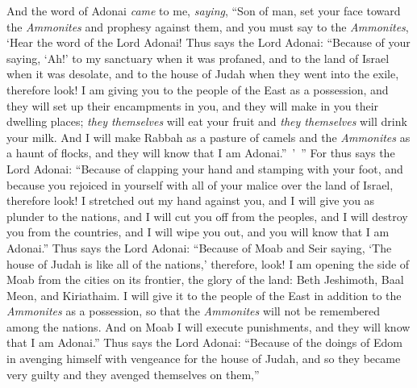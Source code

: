 \begin{biblechapter} %
 And the word of Adonai \textit{came} to me, \textit{saying},
\verse “Son of man, set your face toward the \textit{Ammonites} and prophesy against them,
\verse and you must say to the \textit{Ammonites}, ‘Hear the word of the Lord Adonai! Thus says the Lord Adonai: “Because of your saying, ‘Ah!’ to my sanctuary when it was profaned, and to the land of Israel when it was desolate, and to the house of Judah when they went into the exile,
\verse therefore look! I am giving you to the people of the East as a possession, and they will set up their encampments in you, and they will make in you their dwelling places; \textit{they themselves} will eat your fruit and \textit{they themselves} will drink your milk.
\verse And I will make Rabbah as a pasture of camels and the \textit{Ammonites} as a haunt of flocks, and they will know that I am Adonai.” ’ ”
\verse For thus says the Lord Adonai: “Because of clapping your hand and stamping with your foot, and because you rejoiced in yourself with all of your malice over the land of Israel,
\verse therefore look! I stretched out my hand against you, and I will give you as plunder to the nations, and I will cut you off from the peoples, and I will destroy you from the countries, and I will wipe you out, and you will know that I am Adonai.”
\verse Thus says the Lord Adonai: “Because of Moab and Seir saying, ‘The house of Judah is like all of the nations,’
\verse therefore, look! I am opening the side of Moab from the cities on its frontier, the glory of the land: Beth Jeshimoth, Baal Meon, and Kiriathaim.
\verse I will give it to the people of the East in addition to the \textit{Ammonites} as a possession, so that the \textit{Ammonites} will not be remembered among the nations.
\verse And on Moab I will execute punishments, and they will know that I am Adonai.”
\verse Thus says the Lord Adonai: “Because of the doings of Edom in avenging himself with vengeance for the house of Judah, and so they became very guilty and they avenged themselves on them,”

\end{biblechapter}

